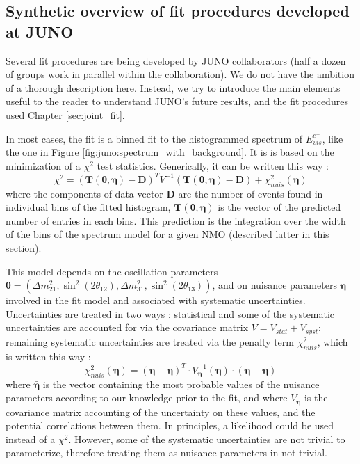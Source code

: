 \documentclass[../main.tex]{subfiles}
\begin{document}
\subsection{Synthetic overview of fit procedures developed at JUNO}
\label{sec:juno:fit:subatech}

Several fit procedures are being developed by JUNO collaborators (half a dozen of groups work in parallel within the collaboration). We do not have the ambition of a thorough description here. Instead, we try to introduce the main elements useful to the reader to understand JUNO's future results, and the fit procedures used Chapter \ref{sec:joint_fit}.

In most cases, the fit is a binned fit to the histogrammed spectrum of $E_{vis}^{e^+}$, like the one in Figure \ref{fig:juno:spectrum_with_background}. It is is based on the minimization of a $\chi^2$ test statistics. Generically, it can be written this way :
\begin{equation}
  \label{eq:juno:chi2}
  \chi^2= \left(\bm{T}(\bm{\theta},\bm{\eta}) - \bm{D}  \right)^T V^{-1} \left(\bm{T}(\bm{\theta},\bm{\eta}) - \bm{D} \right) + \chi^2_{nuis}(\bm{\eta})
\end{equation}
where the components of data vector $\bm{D}$ are the number of events found in individual bins of the fitted histogram, $\bm{T}(\bm{\theta},\bm{\eta})$ is the vector of the predicted number of entries in each bins. This prediction is the integration over the width of the bins of the spectrum model for a given NMO (described latter in this section).

This model depends on the oscillation parameters $\bm{\theta} = \left(\Delta m^2_{21}, \sin^2(2\theta_{12}), \Delta m^2_{31}, \sin^2(2\theta_{13} )\right)$, and on nuisance parameters $\bm{\eta}$ involved in the fit model and associated with systematic uncertainties.
Uncertainties are treated in two ways : statistical and some of the systematic uncertainties are accounted for via the covariance matrix $V = V_{stat}+V_{syst}$; remaining systematic uncertainties are treated via the penalty term $\chi^2_{nuis}$, which is written this way :
\begin{equation}
  \label{eq:juno:nuis}
  \chi^2_{nuis}\left(\bm{\eta}\right)= \left(\bm{\eta}-\bm{\bar{\eta}}\right)^T \cdot V^{-1}_{\bm{\eta}}(\bm{\eta})  \cdot \left(\bm{\eta}-\bm{\bar{\eta}}\right)
\end{equation}
where $\bm{\bar{\eta}}$ is the vector containing the most probable values of the nuisance parameters according to our knowledge prior to the fit, and where $V_{\bm{\eta}}$ is the covariance matrix accounting of the uncertainty on these values, and the potential correlations between them.
In principles, a likelihood could be used instead of a $\chi^2$. However, some of the systematic uncertainties are not trivial to parameterize, therefore treating them as nuisance parameters in not trivial.
\end{document}
